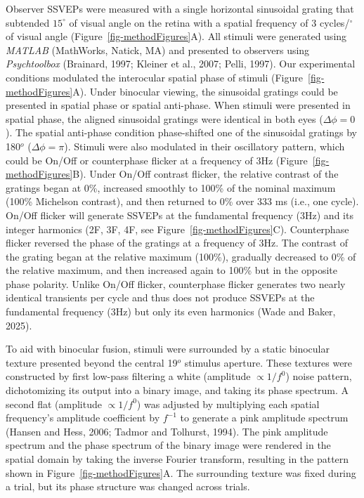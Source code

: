 \documentclass[review,
  12pt,
]{elsarticle}
\begin{document}
Observer SSVEPs were measured with a single horizontal sinusoidal
grating that subtended \(15^\circ\) of visual angle on the retina with a
spatial frequency of 3 cycles/\(^\circ\) of visual angle
(Figure~\ref{fig-methodFigures}A). All stimuli were generated using
\textit{MATLAB} (MathWorks, Natick, MA) and presented to observers using
\textit{Psychtoolbox} (Brainard, 1997; Kleiner et al., 2007; Pelli,
1997). Our experimental conditions modulated the interocular spatial
phase of stimuli (Figure~\ref{fig-methodFigures}A). Under binocular
viewing, the sinusoidal gratings could be presented in spatial phase or
spatial anti-phase. When stimuli were presented in spatial phase, the
aligned sinusoidal gratings were identical in both eyes
(\(\Delta \phi = 0\)). The spatial anti-phase condition phase-shifted
one of the sinusoidal gratings by 180\(^o\) (\(\Delta \phi = \pi\)).
Stimuli were also modulated in their oscillatory pattern, which could be
On/Off or counterphase flicker at a frequency of 3Hz
(Figure~\ref{fig-methodFigures}B). Under On/Off contrast flicker, the
relative contrast of the gratings began at 0\%, increased smoothly to
100\% of the nominal maximum (100\% Michelson contrast), and then
returned to 0\% over 333 ms (i.e., one cycle). On/Off flicker will
generate SSVEPs at the fundamental frequency (3Hz) and its integer
harmonics (2F, 3F, 4F, see Figure~\ref{fig-methodFigures}C).
Counterphase flicker reversed the phase of the gratings at a frequency
of 3Hz. The contrast of the grating began at the relative maximum
(100\%), gradually decreased to 0\% of the relative maximum, and then
increased again to 100\% but in the opposite phase polarity. Unlike
On/Off flicker, counterphase flicker generates two nearly identical
transients per cycle and thus does not produce SSVEPs at the fundamental
frequency (3Hz) but only its even harmonics (Wade and Baker, 2025).

To aid with binocular fusion, stimuli were surrounded by a static
binocular texture presented beyond the central 19\(^o\) stimulus
aperture. These textures were constructed by first low-pass filtering a
white (amplitude \(\propto 1/f^0\)) noise pattern, dichotomizing its
output into a binary image, and taking its phase spectrum. A second flat
(amplitude \(\propto 1/f^0\)) was adjusted by multiplying each spatial
frequency's amplitude coefficient by \(f^{-1}\) to generate a pink
amplitude spectrum (Hansen and Hess, 2006; Tadmor and Tolhurst, 1994).
The pink amplitude spectrum and the phase spectrum of the binary image
were rendered in the spatial domain by taking the inverse Fourier
transform, resulting in the pattern shown in
Figure~\ref{fig-methodFigures}A. The surrounding texture was fixed
during a trial, but its phase structure was changed across trials.
\end{document}

